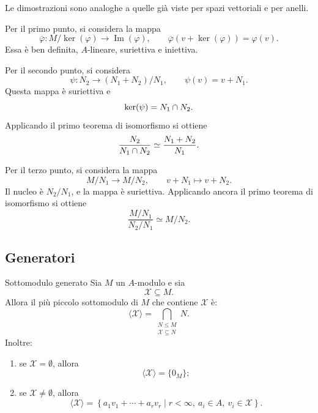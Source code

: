 \documentclass[a4paper]{article}
\begin{document}
\begin{radioactive}
\begin{snippetproof}{}
    Le dimostrazioni sono analoghe a quelle già viste per spazi vettoriali e per anelli.

    Per il primo punto, si considera la mappa
    \[
        \overline{\varphi}\colon M/\ker(\varphi)\to \operatorname{Im}(\varphi),
        \qquad
        \overline{\varphi}(v+\ker(\varphi))=\varphi(v).
    \]
    Essa è ben definita, \(A\)-lineare, suriettiva e iniettiva.

    Per il secondo punto, si considera
    \[
        \psi\colon N_2\to (N_1+N_2)/N_1,
        \qquad
        \psi(v)=v+N_1.
    \]
    Questa mappa è suriettiva e
    \[
        \ker(\psi)=N_1\cap N_2.
    \]
    Applicando il primo teorema di isomorfismo si ottiene
    \[
        \frac{N_2}{N_1\cap N_2}
        \simeq
        \frac{N_1+N_2}{N_1}.
    \]

    Per il terzo punto, si considera la mappa
    \[
        M/N_1\to M/N_2,
        \qquad
        v+N_1\mapsto v+N_2.
    \]
    Il nucleo è \(N_2/N_1\), e la mappa è suriettiva. Applicando ancora il primo teorema di isomorfismo si ottiene
    \[
        \frac{M/N_1}{N_2/N_1}
        \simeq
        M/N_2.
    \]
\end{snippetproof}
\end{radioactive}

\subsection{Generatori}

\begin{radioactive}
\begin{snippetproposition}{Sottomodulo generato}
    Sia \(M\) un \(A\)-modulo e sia
    \[
        \mathcal{X}\subseteq M.
    \]
    Allora il più piccolo sottomodulo di \(M\) che contiene \(\mathcal{X}\) è:
    \[
        \langle \mathcal{X}\rangle
        =
        \bigcap_{\substack{N\leq M\\ \mathcal{X}\subseteq N}}N.
    \]
    Inoltre:
    \begin{enumerate}
        \item se \(\mathcal{X}=\emptyset\), allora
        \[
            \langle \mathcal{X}\rangle=\{0_M\};
        \]
        \item se \(\mathcal{X}\neq\emptyset\), allora
        \[
            \langle \mathcal{X}\rangle
            =
            \left\{
                a_1v_1+\cdots+a_rv_r
                \mid
                r<\infty,\ a_i\in A,\ v_i\in\mathcal{X}
            \right\}.
        \]
    \end{enumerate}
\end{snippetproposition}
\end{radioactive}
\end{document}
